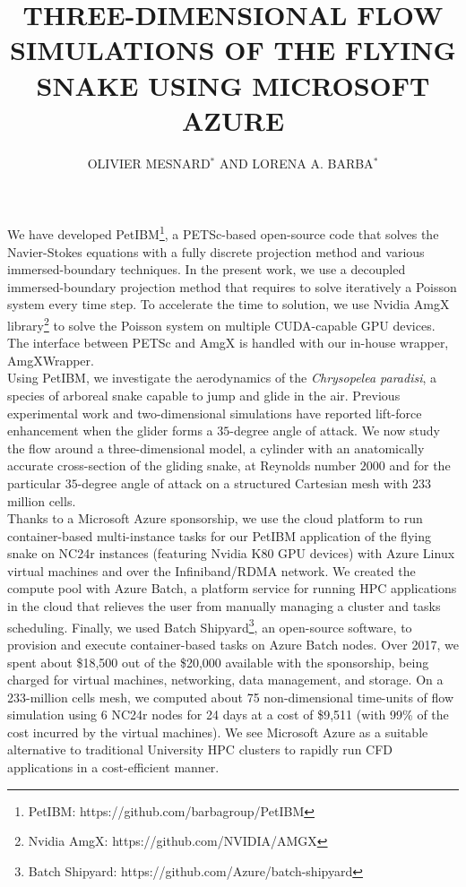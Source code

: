 \documentclass{parcfd2018}
\title{THREE-DIMENSIONAL FLOW SIMULATIONS OF THE FLYING SNAKE USING MICROSOFT AZURE}
\author{OLIVIER MESNARD$^{*}$ AND LORENA A. BARBA$^{*}$}
\begin{document}

We have developed PetIBM\footnote{PetIBM: https://github.com/barbagroup/PetIBM}, a PETSc-based open-source code that solves the Navier-Stokes equations with a fully discrete projection method and various immersed-boundary techniques.
In the present work, we use a decoupled immersed-boundary projection method\cite{Li_et_al_2016} that requires to solve iteratively a Poisson system every time step.
To accelerate the time to solution, we use Nvidia AmgX library\footnote{Nvidia AmgX: https://github.com/NVIDIA/AMGX} to solve the Poisson system on multiple CUDA-capable GPU devices.
The interface between PETSc and AmgX is handled with our in-house wrapper, AmgXWrapper\cite{AmgXWrapper}.\\

Using PetIBM, we investigate the aerodynamics of the \textit{Chrysopelea paradisi}, a species of arboreal snake capable to jump and glide in the air.
Previous experimental work \cite{Holden_et_al_2014} and two-dimensional simulations\cite{Krishnan_et_al_2014, Mesnard_Barba_2017} have reported lift-force enhancement when the glider forms a $35$-degree angle of attack.
We now study the flow around a three-dimensional model, a cylinder with an anatomically accurate cross-section of the gliding snake, at Reynolds number $2000$ and for the particular $35$-degree angle of attack on a structured Cartesian mesh with $233$ million cells.\\

Thanks to a Microsoft Azure sponsorship, we use the cloud platform to run container-based multi-instance tasks for our PetIBM application of the flying snake on NC24r instances (featuring Nvidia K80 GPU devices) with Azure Linux virtual machines and over the Infiniband/RDMA network.
We created the compute pool with Azure Batch, a platform service for running HPC applications in the cloud that relieves the user from manually managing a cluster and tasks scheduling.
Finally, we used Batch Shipyard\footnote{Batch Shipyard: https://github.com/Azure/batch-shipyard}, an open-source software, to provision and execute container-based tasks on Azure Batch nodes.
Over 2017, we spent about \$18,500 out of the \$20,000 available with the sponsorship, being charged for virtual machines, networking, data management, and storage.
On a 233-million cells mesh, we computed about 75 non-dimensional time-units of flow simulation using 6 NC24r nodes for 24 days at a cost of \$9,511 (with 99\% of the cost incurred by the virtual machines).
We see Microsoft Azure as a suitable alternative to traditional University HPC clusters to rapidly run CFD applications in a cost-efficient manner.
\end{document}
